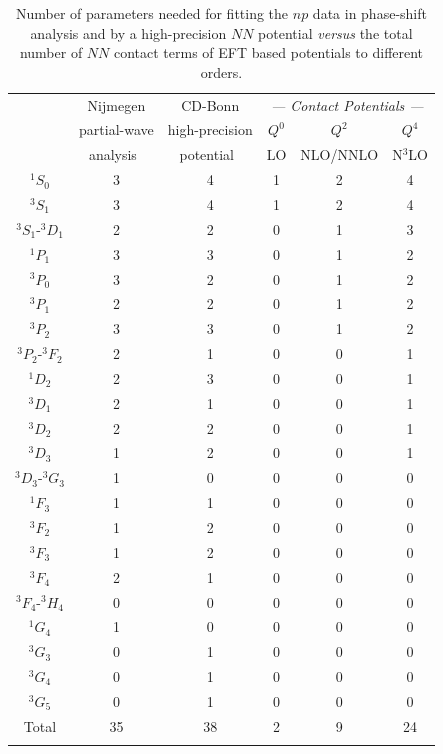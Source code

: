 \documentclass[sort&compress,preprint,3p]{elsarticle}
\begin{document}
\begin{table}[t]
\caption{Number of parameters needed for fitting the $np$ data
in phase-shift analysis and by a high-precision $NN$ potential
{\it versus} the total number of $NN$ contact terms of EFT based potentials 
to different orders. 
\label{tab_par}}
\smallskip
\begin{tabular*}{\textwidth}{@{\extracolsep{\fill}}ccc|ccc}
\hline 
\hline 
\noalign{\smallskip}
     & Nijmegen     & CD-Bonn        & 
               \multicolumn{3}{c}{\it --- Contact Potentials --- }\\
     & partial-wave & high-precision & $Q^0$ & $Q^2$  & $Q^4$ \\
     & analysis~\cite{Sto93} & potential~\cite{Mac01} & 
                                 LO & NLO/NNLO  & N$^3$LO \\
\hline 
\hline 
\noalign{\smallskip}
$^1S_0$         & 3 & 4 & 1&2 & 4 \\
$^3S_1$         & 3 & 4 & 1&2 & 4 \\
\hline
\noalign{\smallskip}
$^3S_1$-$^3D_1$ & 2 & 2 & 0&1 & 3 \\
\hline
\noalign{\smallskip}
$^1P_1$         & 3 & 3 & 0&1 & 2 \\
$^3P_0$         & 3 & 2 & 0&1 & 2 \\
$^3P_1$         & 2 & 2 & 0&1 & 2 \\
$^3P_2$         & 3 & 3 & 0&1 & 2 \\
\hline
\noalign{\smallskip}
$^3P_2$-$^3F_2$ & 2 & 1 & 0&0 & 1 \\
\hline
\noalign{\smallskip}
$^1D_2$         & 2 & 3 & 0&0 & 1 \\
$^3D_1$         & 2 & 1 & 0&0 & 1 \\
$^3D_2$         & 2 & 2 & 0&0 & 1 \\
$^3D_3$         & 1 & 2 & 0&0 & 1 \\
\hline
\noalign{\smallskip}
$^3D_3$-$^3G_3$ & 1 & 0 & 0&0 & 0 \\
\hline
\noalign{\smallskip}
$^1F_3$         & 1 & 1 & 0&0 & 0 \\
$^3F_2$         & 1 & 2 & 0&0 & 0 \\
$^3F_3$         & 1 & 2 & 0&0 & 0 \\
$^3F_4$         & 2 & 1 & 0&0 & 0 \\
\hline
\noalign{\smallskip}
$^3F_4$-$^3H_4$ & 0 & 0 & 0&0 & 0 \\
\hline
\noalign{\smallskip}
$^1G_4$         & 1 & 0 & 0&0 & 0 \\
$^3G_3$         & 0 & 1 & 0&0 & 0 \\
$^3G_4$         & 0 & 1 & 0&0 & 0 \\
$^3G_5$         & 0 & 1 & 0&0 & 0 \\
\hline
\hline
\noalign{\smallskip}
Total         & 35  & 38 & 2&9 & 24 \\
\hline
\hline
\noalign{\smallskip}
\end{tabular*}
\end{table}
\end{document}

